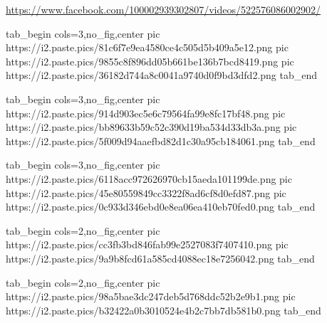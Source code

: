  
 
 
 
 
\zzSecVideo

\url{https://www.facebook.com/100002939302807/videos/522576086002902/}

\ifcmt
  tab_begin cols=3,no_fig,center
     pic https://i2.paste.pics/81c6f7e9ea4580ce4c505d5b409a5e12.png
		 pic https://i2.paste.pics/9855c8f896dd05b661be136b7bcd8419.png
		 pic https://i2.paste.pics/36182d744a8c0041a9740d0f9bd3dfd2.png
  tab_end
\fi

\ifcmt
  tab_begin cols=3,no_fig,center
		pic https://i2.paste.pics/914d903ec5e6c79564fa99e8fc17bf48.png
		pic https://i2.paste.pics/bb89633b59c52c390d19ba534d33db3a.png
		pic https://i2.paste.pics/5f009d94aaefbd82d1c30a95cb184061.png
  tab_end
\fi

\ifcmt
  tab_begin cols=3,no_fig,center
		pic https://i2.paste.pics/6118acc972626970cb15aeda101199de.png
		pic https://i2.paste.pics/45e80559849cc3322f8ad6cf8d0efd87.png
		pic https://i2.paste.pics/0c933d346ebd0e8ea06ea410eb70fed0.png
  tab_end
\fi

\ifcmt
  tab_begin cols=2,no_fig,center
		pic https://i2.paste.pics/cc3fb3bd846fab99e2527083f7407410.png
		pic https://i2.paste.pics/9a9b8fcd61a585cd4088ec18e7256042.png
  tab_end
\fi

\ifcmt
  tab_begin cols=2,no_fig,center
		pic https://i2.paste.pics/98a5bae3dc247deb5d768ddc52b2e9b1.png
		pic https://i2.paste.pics/b32422a0b3010524e4b2c7bb7db581b0.png
  tab_end
\fi
